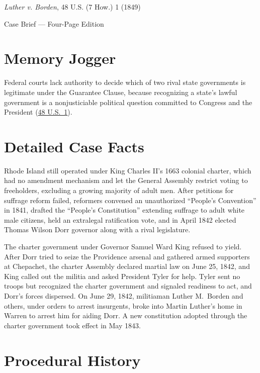\documentclass[12pt]{article}
\begin{document}
\begin{center}
{\LARGE \textit{Luther v. Borden}, 48 U.S. (7 How.) 1 (1849)\par}
\vspace{0.8em}
{\large Case Brief --- Four-Page Edition\par}
\end{center}
\vspace{1em}

\section{Memory Jogger}

Federal courts lack authority to decide which of two rival state governments is legitimate under the Guarantee Clause, because recognizing a state's lawful government is a nonjusticiable political question committed to Congress and the President (\href{https://supreme.justia.com/cases/federal/us/48/1/}{48 U.S.\ 1}).

\section{Detailed Case Facts}

Rhode Island still operated under King Charles II's 1663 colonial charter, which had no amendment mechanism and let the General Assembly restrict voting to freeholders, excluding a growing majority of adult men. After petitions for suffrage reform failed, reformers convened an unauthorized ``People's Convention'' in 1841, drafted the ``People's Constitution'' extending suffrage to adult white male citizens, held an extralegal ratification vote, and in April 1842 elected Thomas Wilson Dorr governor along with a rival legislature.

The charter government under Governor Samuel Ward King refused to yield. After Dorr tried to seize the Providence arsenal and gathered armed supporters at Chepachet, the charter Assembly declared martial law on June 25, 1842, and King called out the militia and asked President Tyler for help. Tyler sent no troops but recognized the charter government and signaled readiness to act, and Dorr's forces dispersed. On June 29, 1842, militiaman Luther M.\ Borden and others, under orders to arrest insurgents, broke into Martin Luther's home in Warren to arrest him for aiding Dorr. A new constitution adopted through the charter government took effect in May 1843.

\section{Procedural History}
\end{document}
